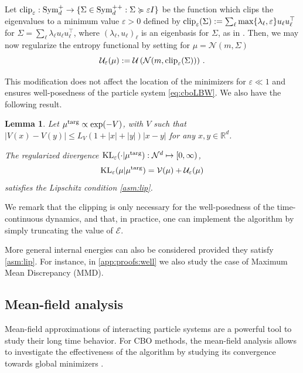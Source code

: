 \documentclass{article}
\theoremstyle{plain}
\newtheorem{lemma}[theorem]{Lemma}
\theoremstyle{definition}
\theoremstyle{remark}
\newcommand{\Rd}{ {\mathbb{R}^d}}
\newcommand{\E}{\mathcal{E}}
\newcommand{\U}{\mathcal{U}}
\newcommand{\ve}{\varepsilon}
\newcommand{\pd}{\textup{Sym}^{++}_d}
\newcommand{\psd}{\textup{Sym}^{+}_d}
\newcommand{\KL}{\textup{KL}}
\newcommand{\targ}{\textup{targ}}
\newcommand{\clip}{\textup{clip}}
\begin{document}
 Let $\clip_{\ve}: \psd \to  \{\Sigma \in \pd: \Sigma \succcurlyeq \ve I\}$ be the function which clips the eigenvalues to a minimum value $\ve>0$ defined by $\textup{clip}_\ve(\Sigma) := \sum_{\ell} \max\{\lambda_\ell, \ve\} u_\ell u_\ell^\top $ for $\Sigma = \sum_{\ell} \lambda_\ell u_\ell u_\ell^\top$, 
where $(\lambda_\ell, u_\ell)_\ell$ is an eigenbasis for $\Sigma$, as in \cite{lambert2022variational}. Then, we may now regularize the entropy functional by setting for $\mu = \mathcal{N}(m, \Sigma)$
\begin{equation} \label{eq:clip}
\U_\ve(\mu) : = \U\left( \mathcal{N}(m, \clip_\ve(\Sigma))\right)\, .
\end{equation}

This modification does not affect the location of the minimizers for $\ve \ll 1$ and ensures well-posedness of the particle system \eqref{eq:cboLBW}. We also have the following result.

\begin{lemma} \label{l:KLregularized}
Let $\mu^\targ \propto \exp(-V)$, with $V$ such that 
$
|V(x) - V(y)| \leq L_V(1 + |x| + |y|)|x - y|$
for any $x,y \in \Rd$. 

 The regularized divergence
$\KL_\ve(\cdot | \mu^\targ): \mathcal{N}^d \mapsto [0, \infty)$,  
\[\KL_\ve(\mu | \mu^\targ)= \mathcal{V}(\mu) + \mathcal{U}_\ve(\mu)\]
satisfies the Lipschitz condition \eqref{asm:lip}.
\end{lemma}
We remark that the clipping is only necessary for the well-posedness of the time-continuous dynamics, and that, in practice, one can implement the algorithm by simply truncating the value of $\E$.

More general internal energies can also be considered provided they satisfy \eqref{asm:lip}. For instance, in \cref{app:proofs:well} we also study the case of Maximum Mean Discrepancy (MMD).




\subsection{Mean-field analysis}


Mean-field approximations of interacting particle systems are a powerful tool to study their long time behavior. For CBO methods, the mean-field analysis allows to investigate the effectiveness of the algorithm by studying its convergence towards global minimizers \cite{carrillo2018analytical,carrillo2021consensus,fornasier2024consensusbased}.
\end{document}
